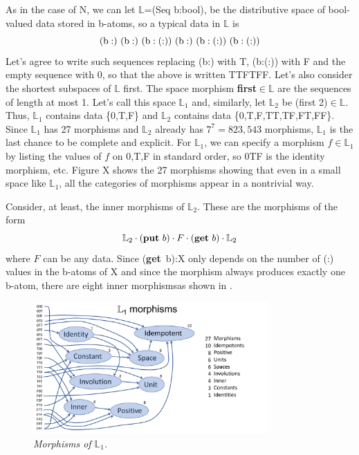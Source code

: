 \documentclass[11pt]{article}
\begin{document}
As in the case of N, we can let $\mathbb L$=(Seq b:bool), be the distributive space of bool-valued data stored in b-atoms, so a typical data in $\mathbb L$ is 
\begin{equation}
{\rm (b:)\ (b:)\ (b:(:))\ (b:)\ (b:(:))\ (b:(:))}
\end{equation}
Let's agree to write such sequences replacing (b:) with T, (b:(:)) with F and the empty sequence with 0, so that the above is written TTFTFF.   
Let's also consider the shortest subspaces of $\mathbb L$ first.  The space morphism {\bf first}$\in\mathbb L$ are the sequences of length at most 1.  
Let's call this space ${\mathbb L}_1$ and, similarly, let ${\mathbb L}_2$ be (first 2)$\in\mathbb L$.  Thus, ${\mathbb L}_1$ contains data \{0,T,F\} and ${\mathbb L}_2$ contains data \{0,T,F,TT,TF,FT,FF\}. 
Since ${\mathbb L}_1$ has 27 morphisms and ${\mathbb L}_2$ already has $7^7=823,543$ morphisms, ${\mathbb L}_1$ is the last chance to be complete and explicit.  
For ${\mathbb L}_1$, we can specify a morphism $f\in {\mathbb L}_1$ by listing the values of $f$ on 0,T,F in standard order, so 0TF is the identity morphism, etc.  
Figure X shows the 27 morphisms showing that even in a small space like ${\mathbb L}_1$, all the categories of morphisms appear in a nontrivial way.  

    Consider, at least, the inner morphisms of ${\mathbb L}_2$.  These are the morphisms of the form
 \begin{equation}
 {\mathbb L}_2\cdot ({\bf put}\ b)\cdot F \cdot ({\bf get}\ b) \cdot {\mathbb L}_2 
 \end{equation}
 where $F$ can be any data.  Since ({\bf get}\ b):X only depends on the number of (:) values in the b-atoms of X and since the morphism always produces exactly one b-atom, 
 there are eight inner morphismsas shown in \cite{L2}.

\begin{figure}[h]
\centering
\includegraphics[width=0.8\textwidth]{L1.pdf}
\caption{{\it Morphisms of ${\mathbb L}_1$.}}
\end{figure}
\end{document}
